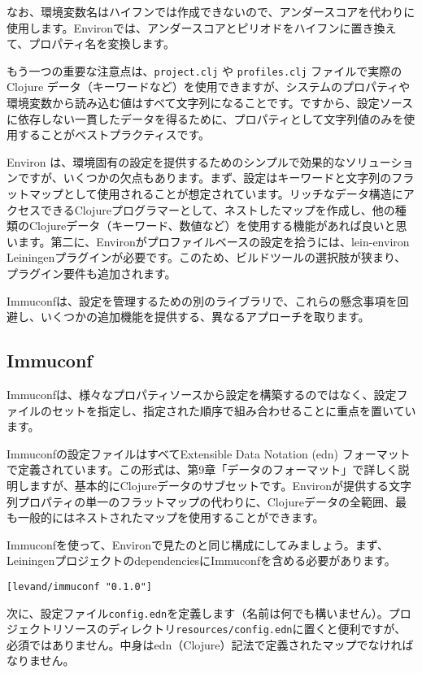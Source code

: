 なお、環境変数名はハイフンでは作成できないので、アンダースコアを代わりに使用します。Environでは、アンダースコアとピリオドをハイフンに置き換えて、プロパティ名を変換します。

もう一つの重要な注意点は、\texttt{project.clj} や \texttt{profiles.clj} ファイルで実際の Clojure データ（キーワードなど）を使用できますが、システムのプロパティや環境変数から読み込む値はすべて文字列になることです。ですから、設定ソースに依存しない一貫したデータを得るために、プロパティとして文字列値のみを使用することがベストプラクティスです。

Environ は、環境固有の設定を提供するためのシンプルで効果的なソリューションですが、いくつかの欠点もあります。まず、設定はキーワードと文字列のフラットマップとして使用されることが想定されています。リッチなデータ構造にアクセスできるClojureプログラマーとして、ネストしたマップを作成し、他の種類のClojureデータ（キーワード、数値など）を使用する機能があれば良いと思います。第二に、Environがプロファイルベースの設定を拾うには、lein-environ Leiningenプラグインが必要です。このため、ビルドツールの選択肢が狭まり、プラグイン要件も追加されます。

Immuconfは、設定を管理するための別のライブラリで、これらの懸念事項を回避し、いくつかの追加機能を提供する、異なるアプローチを取ります。


\subsection{Immuconf}

Immuconfは、様々なプロパティソースから設定を構築するのではなく、設定ファイルのセットを指定し、指定された順序で組み合わせることに重点を置いています。

Immuconfの設定ファイルはすべてExtensible Data Notation (edn) フォーマットで定義されています。この形式は、第9章「データのフォーマット」で詳しく説明しますが、基本的にClojureデータのサブセットです。Environが提供する文字列プロパティの単一のフラットマップの代わりに、Clojureデータの全範囲、最も一般的にはネストされたマップを使用することができます。

Immuconfを使って、Environで見たのと同じ構成にしてみましょう。まず、LeiningenプロジェクトのdependenciesにImmuconfを含める必要があります。


\begin{lstlisting}[numbers=none]
[levand/immuconf "0.1.0"]
\end{lstlisting}

次に、設定ファイル\texttt{config.edn}を定義します（名前は何でも構いません）。プロジェクトリソースのディレクトリ\texttt{resources/config.edn}に置くと便利ですが、必須ではありません。中身はedn（Clojure）記法で定義されたマップでなければなりません。


